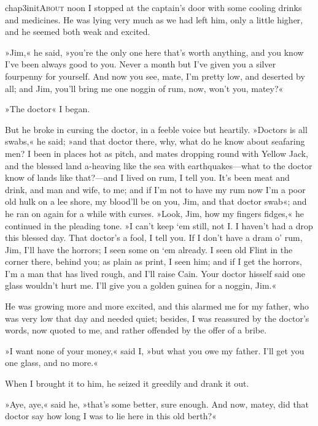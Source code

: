 
   \lettrine[lines=4,image=true]{chap3initA}{bout} noon I stopped at the captain's door with some cooling drinks and medicines. He was lying very much as we had left him, only a little higher, and he seemed both weak and excited.

\zz
»Jim,« he said, »you're the only one here that's worth anything, and you know I've been always good to you. Never a month but I've given you a silver fourpenny for yourself. And now you see, mate, I'm pretty low, and deserted by all; and Jim, you'll bring me one noggin of rum, now, won't you, matey?«

»The doctor\longdash« I began.

But he broke in cursing the doctor, in a feeble voice but heartily. »Doctors is all swabs,« he said; »and that doctor there, why, what do he know about seafaring men? I been in places hot as pitch, and mates dropping round with Yellow Jack, and the blessed land a-heaving like the sea with earthquakes—what to the doctor know of lands like that?—and I lived on rum, I tell you. It's been meat and drink, and man and wife, to me; and if I'm not to have my rum now I'm a poor old hulk on a lee shore, my blood'll be on you, Jim, and that doctor swab«; and he ran on again for a while with curses. »Look, Jim, how my fingers fidges,« he continued in the pleading tone. »I can't keep `em still, not I. I haven't had a drop this blessed day. That doctor's a fool, I tell you. If I don't have a dram o' rum, Jim, I'll have the horrors; I seen some on `em already. I seen old Flint in the corner there, behind you; as plain as print, I seen him; and if I get the horrors, I'm a man that has lived rough, and I'll raise Cain. Your doctor hisself said one glass wouldn't hurt me. I'll give you a golden guinea for a noggin, Jim.«

He was growing more and more excited, and this alarmed me for my father, who was very low that day and needed quiet; besides, I was reassured by the doctor's words, now quoted to me, and rather offended by the offer of a bribe.

»I want none of your money,« said I, »but what you owe my father. I'll get you one glass, and no more.«

When I brought it to him, he seized it greedily and drank it out.

»Aye, aye,« said he, »that's some better, sure enough. And now, matey, did that doctor say how long I was to lie here in this old berth?«


